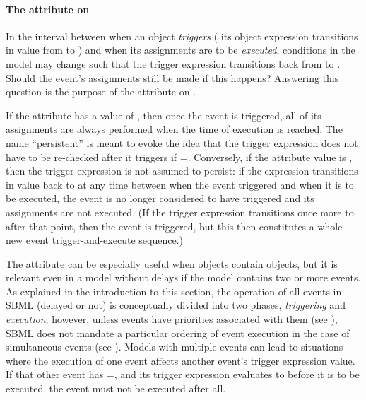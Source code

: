 \paragraph{The  attribute on }
\label{sec:trigger-persistent}

In the interval between when an \Event object \emph{triggers} (\ie
its \Trigger object expression transitions in value from
 to ) and when its assignments are to be
\emph{executed}, conditions in the model may change such that the
trigger expression transitions back from  to
.  Should the event's assignments still be made if this
happens?  Answering this question is the purpose of the
 attribute on \Trigger.

If the  attribute  has a value of
, then once the event is triggered, all of its assignments
are always performed when the time of execution is reached.  The
name ``persistent'' is meant to evoke the idea that the trigger
expression does not have to be re-checked after it triggers if
=.  Conversely, if the attribute value
is , then the trigger expression is not assumed to
persist: if the expression transitions in value back to
 at any time between when the event triggered and when it
is to be executed, the event is no longer considered to have triggered
and its assignments are not executed.  (If the trigger expression
transitions once more to  after that point, then the
event is triggered, but this then constitutes a whole new event
trigger-and-execute sequence.)

The  attribute can be especially useful when
\Event objects contain \Delay objects, but it is relevant even in
a model without delays if the model contains two or more events.
As explained in the introduction to this section, the operation of
all events in SBML (delayed or not) is conceptually divided into
two phases, \emph{triggering} and \emph{execution}; however, unless
events have priorities associated with them (see
), SBML does not mandate a
particular ordering of event execution in the case of simultaneous
events (see ).  Models with
multiple events can lead to situations where the execution of one
event affects another event's trigger expression value.  If that
other event has =, and its trigger
expression evaluates to  before it is to be executed,
the event must not be executed after all.


